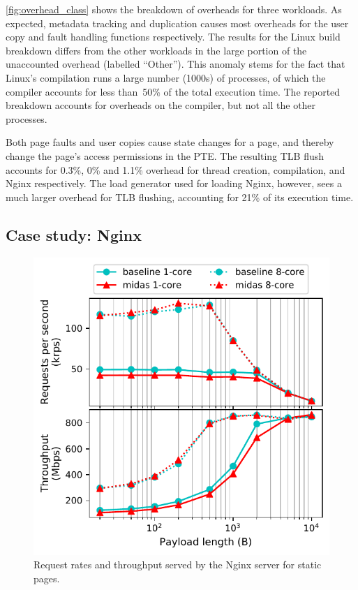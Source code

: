 \autoref{fig:overhead_class} shows the breakdown of overheads for three
workloads.
As expected, metadata tracking and duplication causes most overheads
for the user copy and fault handling functions respectively.
The results for the Linux build breakdown differs 
from the other workloads
in the large portion of
the unaccounted overhead (labelled ``Other'').
This anomaly stems for the fact that Linux's compilation runs a large number (1000s)
of processes, of which the compiler accounts for less than~50\% of the
total execution time.
The reported breakdown accounts for overheads on the compiler, but not
all the other processes.

Both page faults and user copies cause state changes for a page, and thereby
change the page's access permissions in the PTE.
The resulting TLB flush accounts for 0.3\%, 0\% and 1.1\% overhead for
thread creation, compilation, and Nginx respectively.
The load generator  used for loading Nginx, however, sees
a much larger overhead for TLB flushing, accounting for
21\% of its execution time.

\subsection{Case study: Nginx}

\begin{figure}
  \centering
  \includegraphics[width=\linewidth]{media/midas/nginx_performance.pdf}
  \caption{Request rates and throughput served by the Nginx server for
          static pages.}
  \label{fig:nginx_perf}
\end{figure}

